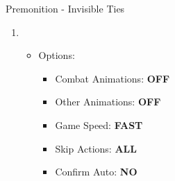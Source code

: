 \begin{battlespecial}{Premonition - Invisible Ties}
\begin{enumerate}
\item \ 
\begin{itemize}
\item Options:
\begin{itemize}
\item Combat Animations: \textbf{OFF}
\item Other Animations: \textbf{OFF}
\item Game Speed: \textbf{FAST}
\item Skip Actions: \textbf{ALL}
\item Confirm Auto: \textbf{NO}
\end{itemize}
\autoblitz
\auto
\end{itemize}
\autoturn
\end{enumerate}
\end{battlespecial}